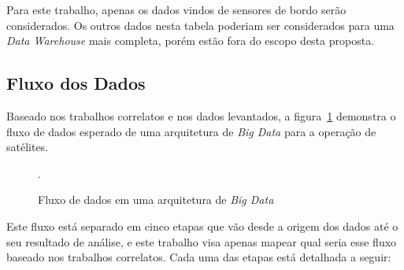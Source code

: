 Para este trabalho, apenas os dados vindos de sensores de bordo serão considerados.
Os outros dados nesta tabela poderiam ser considerados para uma \textit{Data Warehouse} mais completa, porém estão fora do escopo desta proposta.

\subsection{Fluxo dos Dados}\label{ch:prop:dataflow}

Baseado nos trabalhos correlatos e nos dados levantados, a figura~\ref{fig:bigdataflow} demonstra o fluxo de dados esperado de uma arquitetura de \textit{Big Data} para a operação de satélites.

\begin{figure}[ht]
	\caption{Fluxo de dados em uma arquitetura de \textit{Big Data}}\label{fig:bigdataflow}
	\vspace{6mm}
	\begin{center}
	\end{center}
	\vspace{2mm}
	\legenda{}
	.
\end{figure}

Este fluxo está separado em cinco etapas que vão desde a origem dos dados até o seu resultado de análise, e este trabalho visa apenas mapear qual seria esse fluxo baseado nos trabalhos correlatos.
Cada uma das etapas está detalhada a seguir:

